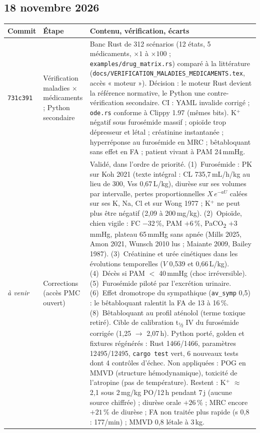 \documentclass[11pt,a4paper]{article}
\newcommand{\commit}[1]{\texttt{\small #1}}
\newcommand{\ecart}[1]{\textcolor{red!60!black}{#1}}
\begin{document}
\subsection*{18 novembre 2026}
\begin{longtable}{@{}p{1.5cm}p{4.2cm}p{10.3cm}@{}}
\toprule
\textbf{Commit} & \textbf{Étape} & \textbf{Contenu, vérification, écarts}\\
\midrule\endhead
\commit{731c391} & Vérification maladies $\times$ médicaments ; Python secondaire & Banc Rust de 312 scénarios (12 états, 5 médicaments, $\times1$ à $\times100$ ; \texttt{examples/drug\_matrix.rs}) comparé à la littérature (\texttt{docs/VERIFICATION\_MALADIES\_MEDICAMENTS.tex}, accès « moteur »). Décision : le moteur Rust devient la référence normative, le Python une contre-vérification secondaire. CI : YAML invalide corrigé ; \texttt{ode.rs} conforme à Clippy 1.97 (mêmes bits). \ecart{K$^+$ négatif sous furosémide massif ; opioïde trop dépresseur et létal ; créatinine instantanée ; hyperréponse au furosémide en MRC ; bêtabloquant sans effet en FA ; patient vivant à PAM 24\,mmHg.}\\
\textit{à venir} & Corrections (accès PMC ouvert) & Validé, dans l'ordre de priorité. (1)~Furosémide : PK sur Koh 2021 (texte intégral : CL 735,7\,mL/h/kg au lieu de 300, Vss 0,67\,L/kg), diurèse sur ses volumes par intervalle, pertes proportionnelles $X\,e^{-aU}$ calées sur ses K, Na, Cl et sur Wong 1977 ; K$^+$ ne peut plus être négatif (2,09 à 200\,mg/kg). (2)~Opioïde, chien vigile : FC $-32$\,\%, PAM $+6$\,\%, PaCO\textsubscript{2} $+3$\,mmHg, plateau 65\,mmHg sans apnée (Mills 2025, Amon 2021, Wunsch 2010 lus ; Maiante 2009, Bailey 1987). (3)~Créatinine et urée cinétiques dans les évolutions temporelles ($V$ 0,539 et 0,66\,L/kg). (4)~Décès si PAM $<$ 40\,mmHg (choc irréversible). (5)~Furosémide piloté par l'excrétion urinaire. (6)~Effet dromotrope du sympathique (\texttt{av\_symp} 0,5) : le bêtabloquant ralentit la FA de 13 à 16\,\%. (8)~Bêtabloquant au profil aténolol (terme toxique retiré). Cible de calibration t\textsubscript{½} IV du furosémide corrigée (1,25 $\to$ 2,07\,h). Python porté, golden et fixtures régénérés : Rust 1466/1466, paramètres 12495/12495, \texttt{cargo test} vert, 6 nouveaux tests dont 4 contrôles d'échec. \ecart{Non appliquées : POG en MMVD (structure hémodynamique), toxicité de l'atropine (pas de température). Restent : K$^+$ $\approx$ 2,1 sous 2\,mg/kg PO/12\,h pendant 7\,j (aucune source chiffrée) ; diurèse orale $+26$\,\% ; MRC encore $+21$\,\% de diurèse ; FA non traitée plus rapide (s 0,8 : 177/min) ; MMVD 0,8 létale à 3\,kg.}\\

\end{longtable}
\end{document}
